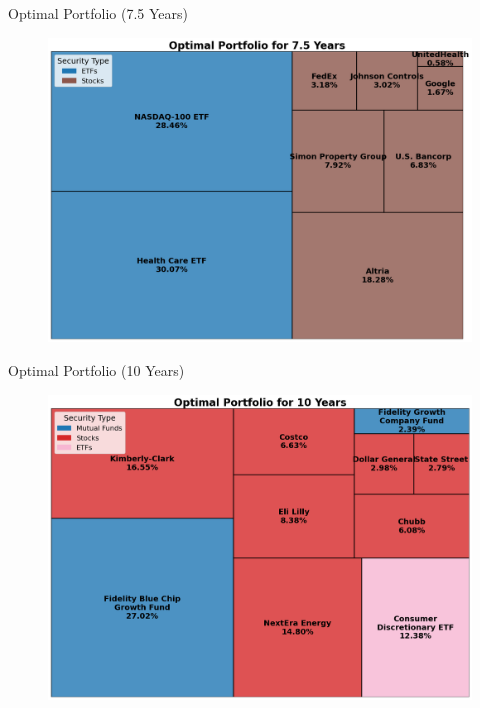 \documentclass{beamer}
\begin{document}
\begin{frame}{Optimal Portfolio (7.5 Years)}
    \begin{figure}
        \centering
        \includegraphics[height=0.8\textheight]{../Figures/optimal_portfolio_7_5_years.png}
    \end{figure}
\end{frame}

\begin{frame}{Optimal Portfolio (10 Years)}
    \begin{figure}
        \centering
        \includegraphics[height=0.8\textheight]{../Figures/optimal_portfolio_10_years.png}
    \end{figure}
\end{frame}
\end{document}
